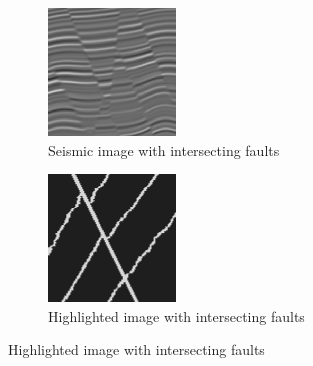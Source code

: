 \documentclass[preprint,12pt]{elsarticle}
\begin{document}
\begin{figure}
    \centering
    \begin{subfigure}[b]{.3\textwidth}
        \includegraphics[width=\textwidth]{images/seismic_intersecting_fault.png}
        \caption{Seismic image with intersecting faults}
        \label{subfig:intersecting_faults}
    \end{subfigure}
    \begin{subfigure}[b]{.3\textwidth}
        \includegraphics[width=\textwidth]{images/highlighted_interesecting_fault.png}
        \caption{Highlighted image with intersecting faults}
        \label{subfig:highlighted_faults}
    \end{subfigure}
\end{figure}
\end{document}
